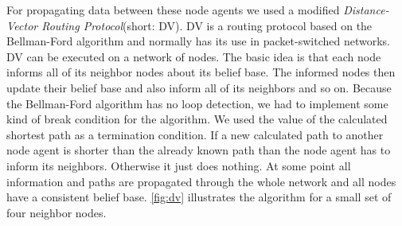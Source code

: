 For propagating data between these node agents we used a modified \emph{Distance-Vector Routing Protocol}(short: DV). DV is a routing protocol based on the Bellman-Ford algorithm and normally has its use in packet-switched networks. DV can be executed on a network of nodes. The basic idea is that each node informs all of its neighbor nodes about its belief base. The informed nodes then update their belief base and also inform all of its neighbors and so on. Because the Bellman-Ford algorithm has no loop detection, we had to implement some kind of break condition for the algorithm. We used the value of the calculated shortest path as a termination condition. If a new calculated path to another node agent is shorter than the already known path than the node agent has to inform its neighbors. Otherwise it just does nothing. At some point all information and paths are propagated through the whole network and all nodes have a consistent belief base. \autoref{fig:dv} illustrates the algorithm for a small set of four neighbor nodes.

